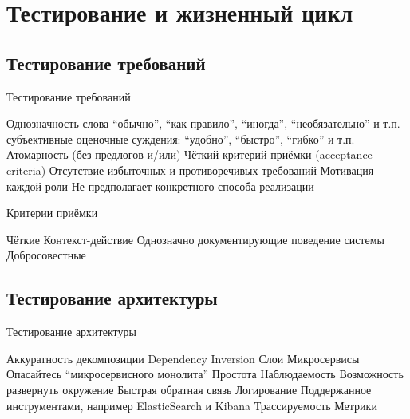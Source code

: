 \documentclass{../../slides-style}
\begin{document}
    \section{Тестирование и жизненный цикл}

    \subsection{Тестирование требований}

    \begin{frame}{Тестирование требований}
        \begin{outline}
            \1 Однозначность
                \2 слова \enquote{обычно}, \enquote{как правило}, \enquote{иногда}, \enquote{необязательно} и т.п.
                \2 субъективные оценочные суждения: \enquote{удобно}, \enquote{быстро}, \enquote{гибко} и т.п.
            \1 Атомарность (без предлогов и/или)
            \1 Чёткий критерий приёмки (acceptance criteria)
            \1 Отсутствие избыточных и противоречивых требований
            \1 Мотивация каждой роли
            \1 Не предполагает конкретного способа реализации
        \end{outline}
    \end{frame}

    \begin{frame}{Критерии приёмки}
        \begin{outline}
            \1 Чёткие
            \1 Контекст-действие
            \1 Однозначно документирующие поведение системы
            \1 Добросовестные
        \end{outline}
    \end{frame}

    \subsection{Тестирование архитектуры}

    \begin{frame}{Тестирование архитектуры}
        \begin{outline}
            \1 Аккуратность декомпозиции
                \2 Dependency Inversion
                \2 Слои
                \2 Микросервисы
                    \3 Опасайтесь \enquote{микросервисного монолита}
            \1 Простота
            \1 Наблюдаемость
                \2 Возможность развернуть окружение
                \2 Быстрая обратная связь
                \2 Логирование
                    \3 Поддержанное инструментами, например ElasticSearch и Kibana
                \2 Трассируемость
                \2 Метрики
        \end{outline}
    \end{frame}
\end{document}
